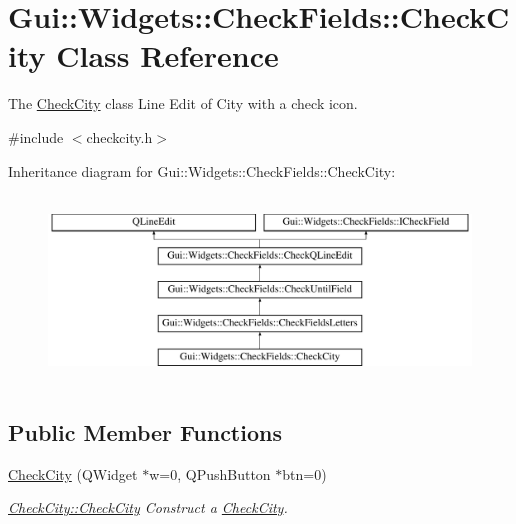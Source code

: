 \hypertarget{classGui_1_1Widgets_1_1CheckFields_1_1CheckCity}{\section{Gui\-:\-:Widgets\-:\-:Check\-Fields\-:\-:Check\-City Class Reference}
\label{classGui_1_1Widgets_1_1CheckFields_1_1CheckCity}
}


The \hyperlink{classGui_1_1Widgets_1_1CheckFields_1_1CheckCity}{Check\-City} class Line Edit of City with a check icon.  




{\ttfamily \#include $<$checkcity.\-h$>$}

Inheritance diagram for Gui\-:\-:Widgets\-:\-:Check\-Fields\-:\-:Check\-City\-:\begin{figure}[H]
\begin{center}
\leavevmode
\includegraphics[height=5.000000cm]{dd/da5/classGui_1_1Widgets_1_1CheckFields_1_1CheckCity}
\end{center}
\end{figure}
\subsection*{Public Member Functions}
\begin{DoxyCompactItemize}
\item 
\hyperlink{classGui_1_1Widgets_1_1CheckFields_1_1CheckCity_a880266cfcc69ab006f907748ec35a101}{Check\-City} (Q\-Widget $\ast$w=0, Q\-Push\-Button $\ast$btn=0)
\begin{DoxyCompactList}\small\item\em \hyperlink{classGui_1_1Widgets_1_1CheckFields_1_1CheckCity_a880266cfcc69ab006f907748ec35a101}{Check\-City\-::\-Check\-City} Construct a \hyperlink{classGui_1_1Widgets_1_1CheckFields_1_1CheckCity}{Check\-City}. \end{DoxyCompactList}\end{DoxyCompactItemize}

